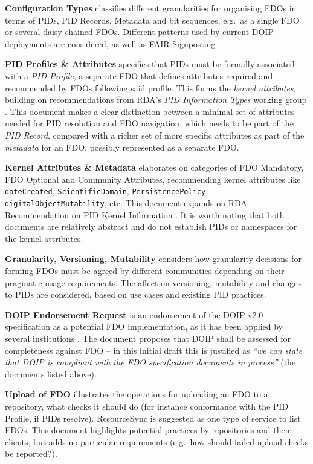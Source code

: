 \documentclass[fleqn,10pt,lineno]{wlpeerjlua}
\begin{document}
\textbf{Configuration Types} \cite{SPd0uEqO} classifies different granularities for organising FDOs in terms of PIDs, PID Records, Metadata and bit sequences, e.g.~as a single FDO or several daisy-chained FDOs. Different patterns used by current DOIP deployments are considered, as well as FAIR Signposting \cite{snykkm7R}

\textbf{PID Profiles \& Attributes} \cite{ljVViWCl} specifies that PIDs must be formally associated with a \emph{PID Profile}, a separate FDO that defines attributes required and recommended by FDOs following said profile. This forms the \emph{kernel attributes}, building on recommendations from RDA's \emph{PID Information Types} working group \cite{lCoshHXg}. This document makes a clear distinction between a minimal set of attributes needed for PID resolution and FDO navigation, which needs to be part of the \emph{PID Record}, compared with a richer set of more specific attributes as part of the \emph{metadata} for an FDO, possibly represented as a separate FDO.

\textbf{Kernel Attributes \& Metadata} \cite{Fi62cJAo} elaborates on categories of FDO Mandatory, FDO Optional and Community Attributes, recommending kernel attributes like \texttt{dateCreated}, \texttt{ScientificDomain}, \texttt{PersistencePolicy}, \texttt{digitalObjectMutability}, etc. This document expands on RDA Recommendation on PID Kernel Information \cite{lCoshHXg}. It is worth noting that both documents are relatively abstract and do not establish PIDs or namespaces for the kernel attributes.

\textbf{Granularity, Versioning, Mutability} \cite{16W9AycSW} considers how granularity decisions for forming FDOs must be agreed by different communities depending on their pragmatic usage requirements. The affect on versioning, mutability and changes to PIDs are considered, based on use cases and existing PID practices.

\textbf{DOIP Endorsement Request} \cite{15yGpJ0wh} is an endorsement of the DOIP v2.0 \cite{13TcbsZF6} specification as a potential FDO implementation, as it has been applied by several institutions \cite{jRWurmQc}. The document proposes that DOIP shall be assessed for completeness against FDO -- in this initial draft this is justified as \emph{``we can state that DOIP is compliant with the FDO specification documents in process''} (the documents listed above).

\textbf{Upload of FDO} \cite{1H7cmmr69} illustrates the operations for uploading an FDO to a repository, what checks it should do (for instance conformance with the PID Profile, if PIDs resolve). ResourceSync \cite{eS5y9TRh} is suggested as one type of service to list FDOs. This document highlights potential practices by repositories and their clients, but adds no particular requirements (e.g.~how should failed upload checks be reported?).
\end{document}
